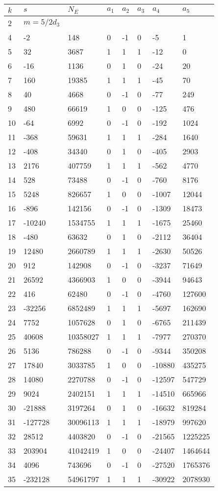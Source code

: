 \documentclass{amsart}
\begin{document}
\begin{longtable}{|l|l|l|lllll|}
\hline
$k$ & $s$ & $N_E$ & $a_1$ & $a_2$ & $a_3$ & $a_4$ & $a_5$\\
\hline
2&$m=5/2d_{3}$&&\multicolumn{5}{c|}{}\\
4&-2&148&0&-1&0&-5&1\\
5&32&3687&1&1&1&-12&0\\
6&-16&1136&0&1&0&-24&20\\
7&160&19385&1&1&1&-45&70\\
8&40&4668&0&-1&0&-77&249\\
9&480&66619&1&0&0&-125&476\\
10&-64&6992&0&-1&0&-192&1024\\
11&-368&59631&1&1&1&-284&1640\\
12&-408&34340&0&1&0&-405&2903\\
13&2176&407759&1&1&1&-562&4770\\
14&528&73488&0&-1&0&-760&8176\\
15&5248&826657&1&0&0&-1007&12044\\
16&-896&142156&0&-1&0&-1309&18473\\
17&-10240&1534755&1&1&1&-1675&25460\\
18&-480&63632&0&1&0&-2112&36404\\
19&12480&2660789&1&1&1&-2630&50526\\
20&912&142908&0&-1&0&-3237&71649\\
21&26592&4366903&1&0&0&-3944&94643\\
22&416&62480&0&-1&0&-4760&127600\\
23&-32256&6852489&1&1&1&-5697&162690\\
24&7752&1057628&0&1&0&-6765&211439\\
25&40608&10358027&1&1&1&-7977&270370\\
26&5136&786288&0&-1&0&-9344&350208\\
27&17840&3033785&1&0&0&-10880&435275\\
28&14080&2270788&0&-1&0&-12597&547729\\
29&9024&2402151&1&1&1&-14510&665966\\
30&-21888&3197264&0&1&0&-16632&819284\\
31&-127728&30096113&1&1&1&-18979&997620\\
32&28512&4403820&0&-1&0&-21565&1225225\\
33&203904&41042419&1&0&0&-24407&1464644\\
34&4096&743696&0&-1&0&-27520&1765376\\
35&-232128&54961797&1&1&1&-30922&2078930\\

\end{longtable}
\end{document}

